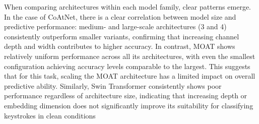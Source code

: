 \documentclass[a4paper,11pt,twoside]{report}
\theoremstyle{definition}
\begin{document}
When comparing architectures within each model family, clear patterns emerge. In the case of CoAtNet, there is a clear correlation between model size and predictive performance: medium- and large-scale architectures (3 and 4) consistently outperform smaller variants, confirming that increasing channel depth and width contributes to higher accuracy. In contrast, MOAT shows relatively uniform performance across all its architectures, with even the smallest configuration achieving accuracy levels comparable to the largest. This suggests that for this task, scaling the MOAT architecture has a limited impact on overall predictive ability. Similarly, Swin Transformer consistently shows poor performance regardless of architecture size, indicating that increasing depth or embedding dimension does not significantly improve its suitability for classifying keystrokes in clean conditions
\end{document}
